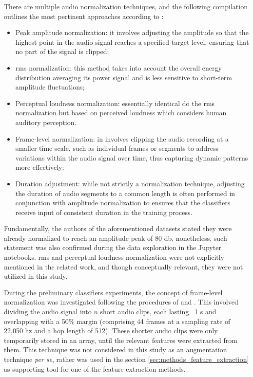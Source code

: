 There are multiple audio normalization techniques, and the following compilation outlines the most pertinent approaches according to \textcite{Mueller2021}:

 \begin{itemize}
    \item Peak amplitude normalization: it involves adjusting the amplitude so that the highest point in the audio signal reaches a specified target level, ensuring that no part of the signal is clipped;
    \item \gls{rms} normalization: this method takes into account the overall energy distribution averaging its power signal and is less sensitive to short-term amplitude fluctuations;
    \item Perceptual loudness normalization: essentially identical do the \gls{rms} normalization but based on perceived loudness which considers human auditory perception.
    \item Frame-level normalization: in involves clipping the audio recording at a smaller time scale, such as individual frames or segments to address variations within the audio signal over time, thus capturing dynamic patterns more effectively;
    \item Duration adjustment: while not strictly a normalization technique, adjusting the duration of audio segments to a common length is often performed in conjunction with amplitude normalization to ensures that the classifiers receive input of consistent duration in the training process.
\end{itemize}

Fundamentally, the authors of the aforementioned datasets stated they were already normalized to reach an amplitude peak of 80 \gls{db}, nonetheless, such statement was also confirmed during the data exploration in the Jupyter notebooks. \gls{rms} and perceptual loudness normalization were not explicitly mentioned in the related work, and though conceptually relevant, they were not utilized in this study.

During the preliminary classifiers experiments, the concept of frame-level normalization was investigated following the procedures of \textcite{Silva2019} and \textcite{Lhoest2021}. This involved dividing the audio signal into $n$ short audio clips, each lasting ~1 \gls{s} and overlapping with a 50\% margin (comprising 44 frames at a sampling rate of 22,050 \gls{hz} and a hop length of 512). These shorter audio clips were only temporarily stored in an array, until the relevant features were extracted from them. This technique was not considered in this study as an augmentation technique \textit{per se}, rather was used in the section \ref{sec:methods_feature_extraction} as supporting tool for one of the feature extraction methods.


